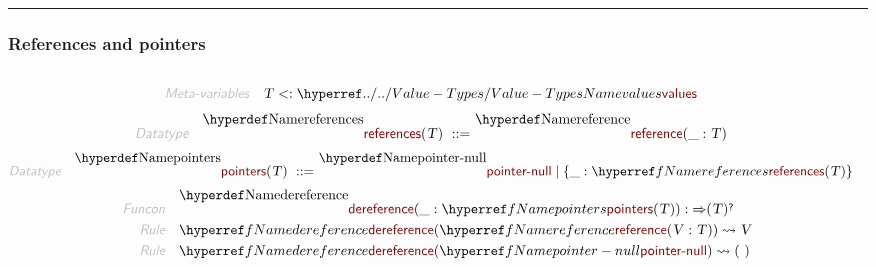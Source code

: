 

\begin{center}
\rule{3in}{0.4pt}
\end{center}

\subsubsection{References and pointers}\hypertarget{references-and-pointers}{}\label{references-and-pointers}

\begin{align*}
  [ \
  \KEY{Datatype} \quad & \NAMEREF{references} \\
  \KEY{Funcon} \quad & \NAMEREF{reference} \\
  \KEY{Type} \quad & \NAMEREF{pointers} \\
  \KEY{Funcon} \quad & \NAMEREF{pointer-null} \\
  \KEY{Funcon} \quad & \NAMEREF{dereference}
  \ ]
\end{align*}
\begin{align*}
  \KEY{Meta-variables} \quad
  & \VAR{T} <: \NAMEHYPER{../..}{Value-Types}{values}
\end{align*}
\begin{align*}
  \KEY{Datatype} \quad 
  \NAMEDECL{references}(
                     \VAR{T} ) 
  \ ::= \ & \NAMEDECL{reference}(
                               \_ : \VAR{T})
\end{align*}
\begin{align*}
  \KEY{Datatype} \quad 
  \NAMEDECL{pointers}(
                     \VAR{T} ) 
  \ ::= \ &
  \NAMEDECL{pointer-null} \mid \{ \_ : \NAMEREF{references}
               (  \VAR{T} ) \}
\end{align*}
\begin{align*}
  \KEY{Funcon} \quad
  & \NAMEDECL{dereference}(
                       \_ : \NAMEREF{pointers}
                                 (  \VAR{T} )) 
    :  \TO (  \VAR{T} )\QUERY 
\\
  \KEY{Rule} \quad
    & \NAMEREF{dereference}
        (  \NAMEREF{reference}
                (  \VAR{V} : \VAR{T} ) ) \leadsto 
        \VAR{V}
\\
  \KEY{Rule} \quad
    & \NAMEREF{dereference}
        (  \NAMEREF{pointer-null} ) \leadsto 
        (   \  )
\end{align*}


